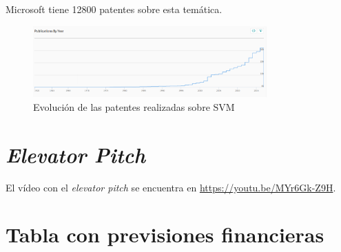\documentclass[11pt,leqno]{article}
\begin{document}
\begin{enumerate}
Microsoft tiene 12800 patentes sobre esta temática.

\begin{figure}[h!]
\centering
\includegraphics[width=0.8\textwidth]{SVM}
\caption{Evolución de las patentes realizadas sobre SVM}
\end{figure}
\end{enumerate}

















\newpage
\section{\textit{Elevator Pitch}}

	El vídeo con el \textit{elevator pitch } se encuentra en \url{https://youtu.be/MYr6Gk-Z9H}.
	
\section{Tabla con previsiones financieras}
\end{document}
